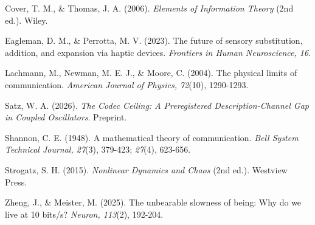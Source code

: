 \documentclass[
  11pt,
]{article}
\begin{document}
Cover, T. M., \& Thomas, J. A. (2006).
\emph{Elements of Information Theory} (2nd ed.).
Wiley.

Eagleman, D. M., \& Perrotta, M. V. (2023). The
future of sensory substitution, addition, and
expansion via haptic devices. \emph{Frontiers in
Human Neuroscience, 16}.

Lachmann, M., Newman, M. E. J., \& Moore, C.
(2004). The physical limits of communication.
\emph{American Journal of Physics, 72}(10),
1290-1293.

Satz, W. A. (2026). \emph{The Codec Ceiling: A
Preregistered Description-Channel Gap in Coupled
Oscillators}. Preprint.

Shannon, C. E. (1948). A mathematical theory of
communication. \emph{Bell System Technical
Journal, 27}(3), 379-423; \emph{27}(4), 623-656.

Strogatz, S. H. (2015). \emph{Nonlinear Dynamics
and Chaos} (2nd ed.). Westview Press.

Zheng, J., \& Meister, M. (2025). The unbearable
slowness of being: Why do we live at 10 bits/s?
\emph{Neuron, 113}(2), 192-204.
\end{document}
